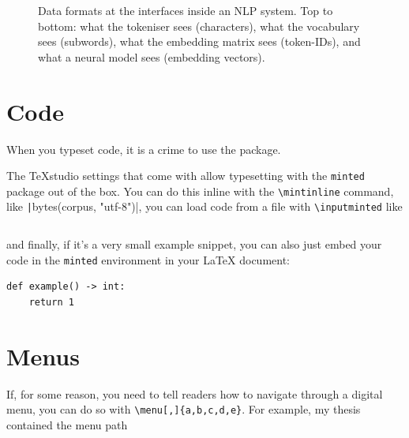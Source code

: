 \begin{figure}[H]
\begin{mdframed}[backgroundcolor=black!5]
\begin{adjustwidth}{0cm}{-1cm}
{
}
\end{adjustwidth}
\end{mdframed}
\caption[Data formats at the interfaces inside an NLP system]{Data formats at the interfaces inside an NLP system. Top to bottom: what the tokeniser sees (characters), what the vocabulary sees (subwords), what the embedding matrix sees (token-IDs), and what a neural model sees (embedding vectors).}
\label{fig:interfaces}
\end{figure}


\section{Code}
When you typeset code, it is a crime to use the  package.

The \TeX{}studio settings that come with \repo allow typesetting with the \verb|minted| package out of the box. You can do this inline with the \verb|\mintinline| command, like \texttt|bytes(corpus, "utf-8")|, you can load code from a file with \verb|\inputminted| like
\inputminted[linenos]{python}{./res/code/hello.py}

and finally, if it's a very small example snippet, you can also just embed your code in the \verb|minted| environment in your \LaTeX{} document:
\begin{verbatim}
def example() -> int:
    return 1
\end{verbatim}

\section{Menus}
If, for some reason, you need to tell readers how to navigate through a digital menu, you can do so with \verb|\menu[,]{a,b,c,d,e}|. For example, my thesis contained the menu path


